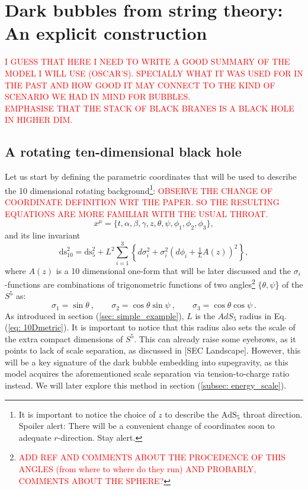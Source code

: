 \documentclass[12pt, a4paper]{article} %
\begin{document}
\section{Dark bubbles from string theory: An explicit construction}\label{sec: db_from_st}
\textcolor{red}{I GUESS THAT HERE I NEED TO WRITE A GOOD SUMMARY OF THE MODEL I WILL USE (OSCAR'S). SPECIALLY WHAT IT WAS USED FOR IN THE PAST AND HOW GOOD IT MAY CONNECT TO THE KIND OF SCENARIO WE HAD IN MIND FOR BUBBLES.}\\

\textcolor{red}{EMPHASISE THAT THE STACK OF BLACK BRANES IS A BLACK HOLE IN HIGHER DIM.}
\subsection{A rotating ten-dimensional black hole}
Let us start by defining the parametric coordinates that will be used to describe the 10 dimensional rotating background\footnote{It is important to notice the choice of $z$ to describe the $\text{AdS}_{5}$ throat direction. Spoiler alert: There will be a convenient change of coordinates soon to adequate $r$-direction. Stay alert.}:
\textcolor{red}{OBSERVE THE CHANGE OF COORDINATE DEFINITION WRT THE PAPER. SO THE RESULTING EQUATIONS ARE MORE FAMILIAR WITH THE USUAL THROAT.}
\begin{equation}\label{eq: 10D_coordinates}
	x^{\mu} = \{t, \alpha, \beta, \gamma, z, \theta, \psi, \phi_{1},\phi_{2},\phi_{3}\},
\end{equation}
and its line invariant
\begin{equation}\label{eq: 10Dmetric}
  \text{ds}_{10}^2= \text{ds}_5^2 + L^2 \sum_{i=1}^3 \left\{ d\sigma_i^2 + \sigma_i^2 \left( d\phi_i + \tfrac{1}{L} A(z) \right)^2 \right\},
\end{equation}
where $A(z)$ is a 10 dimensional one-form that will be later discussed and the $\sigma_i$-functions are combinations of trigonometric functions of two angles\footnote{\textcolor{red}{ADD REF AND COMMENTS ABOUT THE PROCEDENCE OF THIS ANGLES (from where to where do they run) AND PROBABLY, COMMENTS ABOUT THE SPHERE?}} $\{\theta, \psi$\} of the $S^{5}$ as:
\begin{equation}
 \sigma_1 = \sin\theta \ , \qquad \sigma_2 = \cos\theta \sin\psi \ , \qquad \sigma_3 = \cos\theta \cos\psi \ .
\end{equation}
As introduced in section (\ref{sec: simple_example}), $L$ is the $AdS_{5}$ radius in Eq. (\ref{eq: 10Dmetric}). It is important to notice that this radius also sets the scale of the extra compact dimensions of $S^{5}$. This can already raise some eyebrows, as it points to lack of scale separation, as discussed in [SEC Landscape]. However, this will be a key signature of the dark bubble embedding into supegravity, as this model acquires the aforementioned scale separation via tension-to-charge ratio instead. We will later explore this method in section (\ref{subsec: energy_scale}). 
\end{document}

